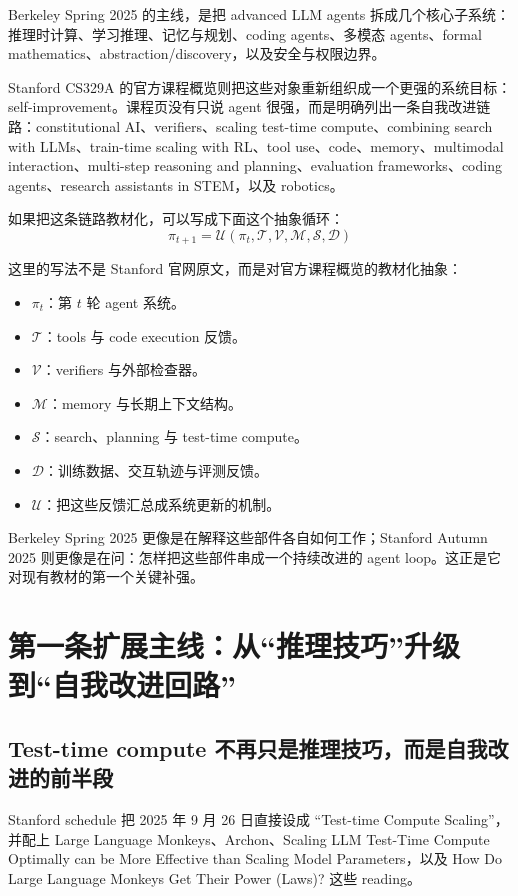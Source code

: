 \documentclass[UTF8]{ctexbook}
\begin{document}
Berkeley Spring 2025 的主线，是把 advanced LLM agents 拆成几个核心子系统：推理时计算、学习推理、记忆与规划、coding agents、多模态 agents、formal mathematics、abstraction/discovery，以及安全与权限边界。

Stanford CS329A 的官方课程概览则把这些对象重新组织成一个更强的系统目标：self-improvement。课程页没有只说 agent 很强，而是明确列出一条自我改进链路：constitutional AI、verifiers、scaling test-time compute、combining search with LLMs、train-time scaling with RL、tool use、code、memory、multimodal interaction、multi-step reasoning and planning、evaluation frameworks、coding agents、research assistants in STEM，以及 robotics。

如果把这条链路教材化，可以写成下面这个抽象循环：
\[
\pi_{t+1} = \mathcal{U}(\pi_t, \mathcal{T}, \mathcal{V}, \mathcal{M}, \mathcal{S}, \mathcal{D})
\]

这里的写法不是 Stanford 官网原文，而是对官方课程概览的教材化抽象：
\begin{itemize}
\item $\pi_t$：第 $t$ 轮 agent 系统。
\item $\mathcal{T}$：tools 与 code execution 反馈。
\item $\mathcal{V}$：verifiers 与外部检查器。
\item $\mathcal{M}$：memory 与长期上下文结构。
\item $\mathcal{S}$：search、planning 与 test-time compute。
\item $\mathcal{D}$：训练数据、交互轨迹与评测反馈。
\item $\mathcal{U}$：把这些反馈汇总成系统更新的机制。
\end{itemize}

Berkeley Spring 2025 更像是在解释这些部件各自如何工作；Stanford Autumn 2025 则更像是在问：怎样把这些部件串成一个持续改进的 agent loop。这正是它对现有教材的第一个关键补强。

\section{第一条扩展主线：从“推理技巧”升级到“自我改进回路”}

\subsection{Test-time compute 不再只是推理技巧，而是自我改进的前半段}

Stanford schedule 把 2025 年 9 月 26 日直接设成 ``Test-time Compute Scaling''，并配上 Large Language Monkeys、Archon、Scaling LLM Test-Time Compute Optimally can be More Effective than Scaling Model Parameters，以及 How Do Large Language Monkeys Get Their Power (Laws)? 这些 reading。
\end{document}

